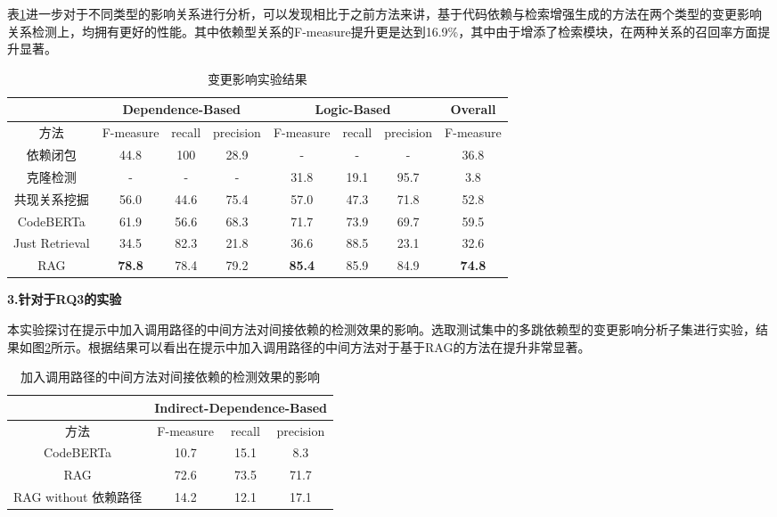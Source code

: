 表\ref{2_变更影响实验结果}进一步对于不同类型的影响关系进行分析，可以发现相比于之前方法来讲，基于代码依赖与检索增强生成的方法在两个类型的变更影响关系检测上，均拥有更好的性能。其中依赖型关系的F-measure提升更是达到16.9\%，其中由于增添了检索模块，在两种关系的召回率方面提升显著。

\begin{table}[htbp]
\caption{变更影响实验结果}
\label{2_变更影响实验结果}
\vspace{0.5em}\centering\wuhao
\begin{tabular}{c|ccc|ccc|c}
\toprule
  & \multicolumn{3}{c|}{Dependence-Based} & \multicolumn{3}{c|}{Logic-Based} & Overall \\
\midrule
方法 & F-measure & recall & precision & F-measure & recall & precision  
 & F-measure\\
\midrule
依赖闭包 &  44.8 & 100 & 28.9 & - & - & - & 36.8 \\
克隆检测 &  - & - & - & 31.8 & 19.1 & 95.7 & 3.8\\
共现关系挖掘 &  56.0 & 44.6 & 75.4 & 57.0 & 47.3 & 71.8 & 52.8\\
CodeBERTa  &   61.9 & 56.6 & 68.3 & 71.7 & 73.9 & 69.7 &59.5\\
Just Retrieval   & 34.5 & 82.3 & 21.8 & 36.6 & 88.5 & 23.1 & 32.6\\
RAG & \textbf{78.8} & 78.4 & 79.2 & \textbf{85.4} & 85.9 & 84.9 & \textbf{74.8}\\
\bottomrule
\end{tabular}
\end{table}

\textbf{3.针对于RQ3的实验}

本实验探讨在提示中加入调用路径的中间方法对间接依赖的检测效果的影响。选取测试集中的多跳依赖型的变更影响分析子集进行实验，结果如图\ref{2_消融实验}所示。根据结果可以看出在提示中加入调用路径的中间方法对于基于RAG的方法在提升非常显著。

\begin{table}[htbp]
\caption{加入调用路径的中间方法对间接依赖的检测效果的影响}
\label{2_消融实验}
\vspace{0.5em}\centering\wuhao
\begin{tabular}{cccc }
\toprule
  & \multicolumn{3}{c}{Indirect-Dependence-Based}  \\
\midrule
方法 & F-measure & recall & precision \\  
\midrule
CodeBERTa  &  10.7 & 15.1 & 8.3 \\
\midrule
RAG  & 72.6 & 73.5 & 71.7 \\
RAG without 依赖路径  & 14.2 & 12.1 & 17.1 \\
\bottomrule
\end{tabular}
\end{table}


